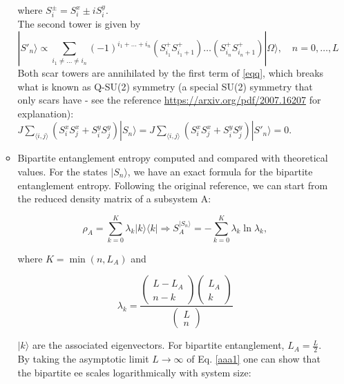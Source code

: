 \documentclass[11pt]{article}
\begin{document}
\begin{itemize}
\begin{itemize}
	where $S_i^\pm = S_i^x \pm i S_i^y$.\\
     The second tower is given by 
     \begin{equation}
	|S'_n\rangle \propto \sum_{i_1 \neq \hdots \neq i_n} (-1)^{i_1 + \hdots + i_n} \left(S^+_{i_1}S^+_{i_1+1}\right)\hdots\left(S^+_{i_n}S^+_{i_n+1}\right)  |\Omega\rangle, \quad n = 0,\hdots,L
	\end{equation}
	Both scar towers are annihilated by the first term of \eqref{eqq}, which breaks what is known as Q-SU(2) symmetry (a special SU(2) symmetry that only scars have - see the reference \href{https://arxiv.org/pdf/2007.16207}{https://arxiv.org/pdf/2007.16207} for explanation): $J \sum_{\langle i,j \rangle} \left( S^x_i S^x_j + S^y_i S^y_j \right)  |S_n\rangle = J \sum_{\langle i,j \rangle} \left( S^x_i S^x_j + S^y_i S^y_j \right)  |S'_n\rangle = 0$.
        \item Bipartite entanglement entropy computed and compared with theoretical values.
        For the states $|S_n\rangle$, we have an exact formula for the bipartite entanglement entropy. Following the original reference, we can start from the reduced density matrix of a subsystem A:
        
        \begin{equation}\label{aaa1}
        \rho_A = \sum_{k=0}^{K} \lambda_k |k\rangle \langle k| \Rightarrow S^{|S_n\rangle }_A = - \sum_{k=0}^{K} \lambda_k \ln \lambda_k,
        \end{equation}
        
        where $K =\min{\left(n, L_A\right)}$ and
        
        \begin{equation}\label{bbb1}
        \lambda_k = \frac{\left( \begin{array}{c} L - L_A \\ n-k \end{array} \right)\left( \begin{array}{c} L_A \\ k \end{array} \right)}{\left( \begin{array}{c} L \\ n \end{array} \right)}
        \end{equation}
        
        $|k\rangle$ are the associated eigenvectors. For bipartite entanglement, $L_A = \frac{L}{2}$.\\
        By taking the asymptotic limit $L\rightarrow\infty$ of Eq. \eqref{aaa1} one can show that the bipartite ee scales logarithmically with system size:
        

\end{itemize}
\end{itemize}
\end{document}
